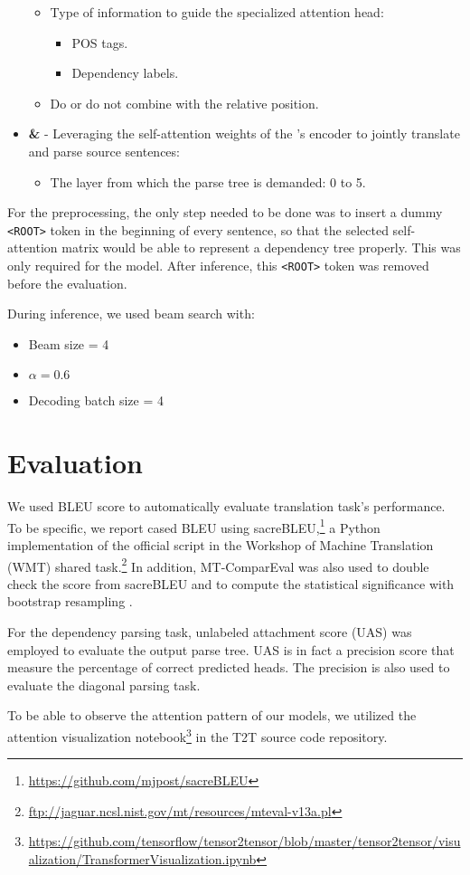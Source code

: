 \begin{itemize}
\begin{itemize}
            \item Type of information to guide the specialized attention head:
                \begin{itemize}
                    \item POS tags.
                    \item Dependency labels.
                \end{itemize}
            \item Do or do not combine with the relative position.
        \end{itemize}
    \item \textbf{\DepParse \& \DiagonalParse} - Leveraging the self-attention weights of the \transformer's encoder to jointly translate and parse source sentences:
        \begin{itemize}
            \item The layer from which the parse tree is demanded: 0 to 5.
        \end{itemize}
\end{itemize}

For the preprocessing, the only step needed to be done was to insert a dummy \texttt{<ROOT>} token in the beginning of every sentence, so that the selected self-attention matrix would be able to represent a dependency tree properly.
This was only required for the \DepParse model.
After inference, this \texttt{<ROOT>} token was removed before the evaluation.

During inference, we used beam search with:
\begin{itemize}
    \item Beam size = 4
    \item $\alpha = 0.6$
    \item Decoding batch size = 4
\end{itemize}

\section{Evaluation}
\label{dataexp-eval}

We used BLEU score to automatically evaluate translation task's performance.
To be specific, we report cased BLEU using sacreBLEU,\footnote{\url{https://github.com/mjpost/sacreBLEU}} a Python implementation of the official script in the Workshop of Machine Translation (WMT) shared task.\footnote{\url{ftp://jaguar.ncsl.nist.gov/mt/resources/mteval-v13a.pl}}
In addition, MT-ComparEval \citep{klejch2015mt} was also used to double check the score from sacreBLEU and to compute the statistical significance with bootstrap resampling \citep{koehn2004statistical}.

For the dependency parsing task, unlabeled attachment score (UAS) was employed to evaluate the output parse tree.
UAS is in fact a precision score that measure the percentage of correct predicted heads.
The precision is also used to evaluate the diagonal parsing task.

To be able to observe the attention pattern of our models, we utilized the attention visualization notebook\footnote{\url{https://github.com/tensorflow/tensor2tensor/blob/master/tensor2tensor/visualization/TransformerVisualization.ipynb}} in the T2T source code repository.

